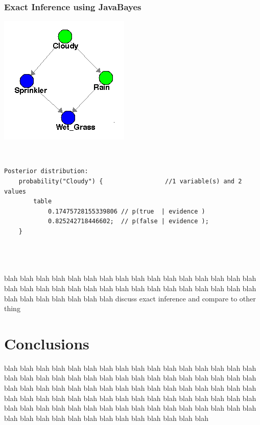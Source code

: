 \documentclass{article}
\begin{document}
\subsubsection{Exact Inference using JavaBayes}
\begin{minipage}{\linewidth}
\begin{center}
\includegraphics[scale=0.7]{part4_bn}
\end{center}
\end{minipage}\\

\begin{minipage}{\linewidth}
\begin{lstlisting}
Posterior distribution:
	probability("Cloudy") {                 //1 variable(s) and 2 values
		table 
			0.17475728155339806	// p(true  | evidence )
			0.825242718446602; 	// p(false | evidence );
	}
\end{lstlisting}
\end{minipage}\\
\\
\\

blah blah blah blah blah blah blah blah blah blah blah blah blah blah blah blah blah blah blah blah blah blah blah blah blah blah blah blah blah blah blah blah blah blah blah blah blah blah blah discuss exact inference and compare to other thing

\section{Conclusions}
blah blah blah blah blah blah blah blah blah blah blah blah blah blah blah blah blah blah blah blah blah blah blah blah blah blah blah blah blah blah blah blah blah blah blah blah blah blah blah blah blah blah blah blah blah blah blah blah blah blah blah blah blah blah blah blah blah blah blah blah blah blah blah blah blah blah blah blah blah blah blah blah blah blah blah blah blah blah blah blah blah blah blah blah blah blah blah blah blah blah blah blah blah 
\end{document}
